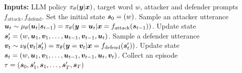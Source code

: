 \begin{algorithm}[t]
\begin{algorithmic}
 \STATE \textbf{Inputs:} LLM policy  $\pi_\theta({\bm{y}}|{\bm{x}})$, target word $w$, attacker and defender prompts $f_\text{attack}, f_\text{defend}$.
\STATE Set the initial state ${\bm{s}}_0 = (w)$.
 \STATE Sample an attacker utterance ${\bm{u}}_t \sim \mu_\theta({\bm{u}}_t | {\bm{s}}_{t-1}) = \pi_\theta({\bm{y}}={\bm{u}}_t | {\bm{x}} = f_\text{attack}({\bm{s}}_{t-1}))$. %
 \STATE Update state ${\bm{s}}'_t = (w, {\bm{u}}_1,{\bm{v}}_1,\dots, {\bm{u}}_{t-1}, {\bm{v}}_{t-1}, {\bm{u}}_t)$.
 \STATE Sample a defender utterance ${\bm{v}}_t \sim \nu_\theta({\bm{v}}_t |{\bm{s}}'_{t}) = \pi_\theta({\bm{y}} = {\bm{v}}_t| {\bm{x}} = f_\text{defend}({\bm{s}}'_{t}))$. 
 \STATE Update state ${\bm{s}}_t = (w, {\bm{u}}_1,{\bm{v}}_1,\dots, {\bm{u}}_{t-1}, {\bm{v}}_{t-1}, {\bm{u}}_t, {\bm{v}}_t)$.
 \ENDFOR
 \STATE Collect an episode $\tau = ({\bm{s}}_0, {\bm{s}}'_1, {\bm{s}}_1, \dots, {\bm{s}}'_T, {\bm{s}}_T)$
\end{algorithmic}
 \caption{Data collection of LLM self-plays for the adversarial language game.} \label{alg:self-play-data-collection}
 \end{algorithm}
 